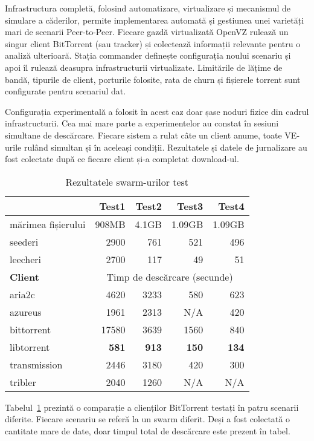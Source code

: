 Infrastructura completă, folosind automatizare, virtualizare și mecanismul
de simulare a căderilor, permite implementarea automată și gestiunea
unei varietăți mari de scenarii Peer-to-Peer. Fiecare gazdă virtualizată
OpenVZ rulează un singur client BitTorrent (sau tracker) și colectează
informații relevante pentru o analiză ulterioară. Stația commander
definește configurația noului scenariu și apoi îl rulează deasupra
infrastructurii virtualizate. Limitările de lățime de bandă, tipurile
de client, porturile folosite, rata de churn și fișierele torrent sunt
configurate pentru scenariul dat.

Configurația experimentală a folosit în acest caz doar șase noduri fizice
din cadrul infrastructurii. Cea mai mare parte a experimentelor au constat
în sesiuni simultane de descărcare. Fiecare sistem a rulat câte un client
anume, toate VE-urile rulând simultan și în aceleași condiții. Rezultatele
și datele de jurnalizare au fost colectate după ce fiecare client și-a
completat download-ul.

\begin{table}[ht]
  \centering
  \begin{tabular}{@{}lrrrr@{}}
    \toprule
    & \textbf{Test1} & \textbf{Test2} & \textbf{Test3} &
    \textbf{Test4} \\
    \midrule
    mărimea fișierului & 908MB & 4.1GB & 1.09GB & 1.09GB	\\
    seederi & 2900 & 761 & 521 & 496	\\
    leecheri & 2700 & 117 & 49 & 51	\\
    \midrule
    \textbf{Client} & \multicolumn{4}{c}{Timp de descărcare (secunde)} \\
    \midrule
    aria2c & 4620 & 3233 & 580 & 623 \\
    azureus & 1961 & 2313 & N/A & 420 \\
    bittorrent & 17580 & 3639 & 1560 & 840 \\
    libtorrent & \textbf{581} & \textbf{913} & \textbf{150} & \textbf{134} \\
    transmission & 2446 & 3180 & 420 & 300 \\
    tribler & 2040 & 1260 & N/A & N/A \\
    \bottomrule
  \end{tabular}
  \caption{Rezultatele swarm-urilor test}
  \label{table:virt-infra:testsw}
\end{table}

Tabelul~\ref{table:virt-infra:testsw} prezintă o comparație a clienților
BitTorrent testați în patru scenarii diferite. Fiecare scenariu se referă
la un swarm diferit. Deși a fost colectată o cantitate mare de date, doar
timpul total de descărcare este prezent în tabel.
